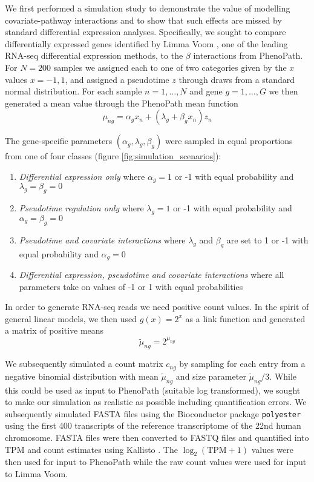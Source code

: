 We first performed a simulation study to demonstrate the value of modelling covariate-pathway interactions and to show that such effects are missed by standard differential expression analyses. Specifically, we sought to compare differentially expressed genes identified by Limma Voom \cite{Law2014-tu}, one of the leading RNA-seq differential expression methods, to the $\beta$ interactions from PhenoPath. For $N = 200$ samples we assigned each to one of two categories given by the $x$ values $x = -1, 1$, and assigned a pseudotime $z$ through draws from a standard normal distribution. For each sample $n = 1, \ldots, N$ and gene $g = 1, \ldots, G$ we then generated a mean value through the PhenoPath mean function
\begin{equation}
  \mu_{ng} = \alpha_g x_n + (\lambda_g + \beta_g x_n) z_n
\end{equation}

The gene-specific parameters $(\alpha_g, \lambda_g, \beta_g)$ were sampled in equal proportions from one of four classes (figure \ref{fig:simulation_scenarios}):
\begin{enumerate}
  \item \emph{Differential expression only} where $\alpha_g = 1$ or -1 with equal probability and $\lambda_g = \beta_g = 0$
  \item \emph{Pseudotime regulation only} where $\lambda_g = 1$ or -1 with equal probability and $\alpha_g = \beta_g = 0$
  \item \emph{Pseudotime and covariate interactions} where $\lambda_g$ and $\beta_g$ are set to 1 or -1  with equal probability and $\alpha_g = 0$
  \item \emph{Differential expression, pseudotime and covariate interactions} where all parameters take on values of -1 or 1 with equal probabilities
\end{enumerate}

In order to generate RNA-seq reads we need positive count values. In the spirit of general linear models, we then used $g(x) = 2^x$ as a link function and generated a matrix of positive means
\begin{equation}
  \tilde{\mu}_{ng} = 2^{\mu_{ng}}
\end{equation}

We subsequently simulated a count matrix $c_{ng}$ by sampling for each entry from a negative binomial distribution with mean $\tilde{\mu}_{ng}$ and size parameter $\tilde{\mu}_{ng} / 3$. While this could be used as input to PhenoPath (suitable log transformed), we sought to make our simulation as realistic as possible including quantification errors. We subsequently simulated FASTA files using the Bioconductor package \texttt{polyester} \cite{Frazee2015-vy} using the first 400 transcripts of the reference transcriptome of the 22nd human chromosome. FASTA files were then converted to FASTQ files
and quantified into TPM and count estimates using Kallisto \cite{Bray2016-uh}. The $\log_2(\text{TPM} + 1)$ values were then used for input to PhenoPath while the raw count values were used for input to Limma Voom.


